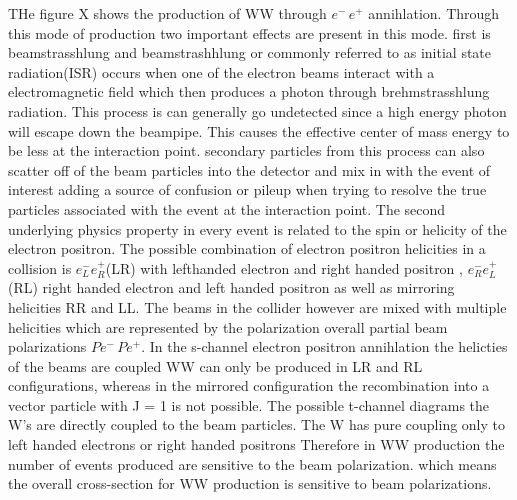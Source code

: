 THe figure X shows the production of WW through $e^- \, e^+$ annihlation. Through this mode of production two important effects are present in this mode. first is beamstrasshlung and beamstrashhlung or commonly referred to as initial state radiation(ISR) occurs when one of the electron beams interact with a electromagnetic field which then produces a photon through brehmstrasshlung radiation. This process is can generally go undetected since a high energy photon will escape down the beampipe. This causes the effective center of mass energy to be less at the interaction point. secondary particles from this process can also scatter off of the beam particles into the detector and mix in with the event of interest adding a source of confusion or pileup when trying to resolve the true particles associated with the event at the interaction point. 
The second underlying physics property in every event is related to the spin or helicity of the electron positron. The possible combination of electron positron helicities in a collision is  $e^-_L e^+_R$(LR) with lefthanded electron and right handed positron , $e^-_R e^+_L$(RL) right handed electron and left handed positron as well as mirroring helicities RR and LL.  The beams in the collider however are mixed with multiple helicities which are represented by the polarization overall partial beam polarizations $Pe^- \, Pe^+$.  In the s-channel electron positron annihlation the helicties of the beams are coupled WW can only be produced in LR and RL configurations, whereas in the mirrored configuration the  recombination
into a vector particle with J = 1 is  not possible. The possible t-channel diagrams the W's are directly coupled to the beam particles. The W has pure coupling only to left handed electrons or right handed positrons Therefore in WW production the number of events produced are sensitive to the beam polarization.  which means the overall cross-section for WW production is sensitive to beam polarizations. 

